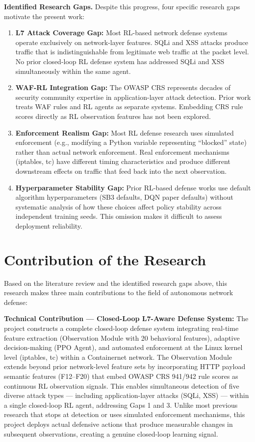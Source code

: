 \documentclass[12pt,a4paper]{report}
\begin{document}
\textbf{Identified Research Gaps.} Despite this progress, four specific research gaps motivate the present work:
\begin{enumerate}
  \item \textbf{L7 Attack Coverage Gap:} Most RL-based network defense systems operate exclusively on network-layer features. SQLi and XSS attacks produce traffic that is indistinguishable from legitimate web traffic at the packet level. No prior closed-loop RL defense system has addressed SQLi and XSS simultaneously within the same agent.
  \item \textbf{WAF-RL Integration Gap:} The OWASP CRS represents decades of security community expertise in application-layer attack detection. Prior work treats WAF rules and RL agents as separate systems. Embedding CRS rule scores directly as RL observation features has not been explored.
  \item \textbf{Enforcement Realism Gap:} Most RL defense research uses simulated enforcement (e.g., modifying a Python variable representing ``blocked'' state) rather than actual network enforcement. Real enforcement mechanisms (iptables, tc) have different timing characteristics and produce different downstream effects on traffic that feed back into the next observation.
  \item \textbf{Hyperparameter Stability Gap:} Prior RL-based defense works use default algorithm hyperparameters (SB3 defaults, DQN paper defaults) without systematic analysis of how these choices affect policy stability across independent training seeds. This omission makes it difficult to assess deployment reliability.
\end{enumerate}

\section{Contribution of the Research}

Based on the literature review and the identified research gaps above, this research makes three main contributions to the field of autonomous network defense:

\textbf{Technical Contribution --- Closed-Loop L7-Aware Defense System:} The project constructs a complete closed-loop defense system integrating real-time feature extraction (Observation Module with 20 behavioral features), adaptive decision-making (PPO Agent), and automated enforcement at the Linux kernel level (iptables, tc) within a Containernet network. The Observation Module extends beyond prior network-level feature sets by incorporating HTTP payload semantic features (F12--F20) that embed OWASP CRS 941/942 rule scores as continuous RL observation signals. This enables simultaneous detection of five diverse attack types --- including application-layer attacks (SQLi, XSS) --- within a single closed-loop RL agent, addressing Gaps 1 and 3. Unlike most previous research that stops at detection or uses simulated enforcement mechanisms, this project deploys actual defensive actions that produce measurable changes in subsequent observations, creating a genuine closed-loop learning signal.
\end{document}
